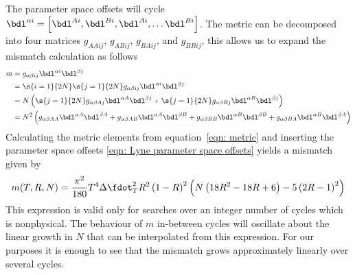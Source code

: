 The parameter
space offsets will cycle $\bdl^{\alpha i} = \left[\bdl^{A i}, \bdl^{B i}, \bdl^{A i}, \dots \bdl^{Bi}\right]$.
The metric can be decomposed into four matrices $g_{AAij}$, $g_{ABij}$, $g_{BAij}$, and $g_{BBij}$, this
allows us to expand the mismatch calculation as follows
\begin{align}
m & = g_{\alpha \beta i j} \bdl^{\alpha i} \bdl^{\beta j} \\
& = \s{i=1}{2N}\s{j=1}{2N} g_{\alpha \beta i j} \bdl^{\alpha i} \bdl^{\beta j} \\
& = N\left(\s{j=1}{2N} g_{\alpha \beta A j} \bdl^{\alpha A} \bdl^{\beta j} + \s{j=1}{2N} g_{\alpha \beta B j} \bdl^{\alpha B} \bdl^{\beta j} \right) \\
& = N^{2}\left(g_{\alpha\beta AA} \bdl^{\alpha A} \bdl^{\beta A} + g_{\alpha \beta AB} \bdl^{\alpha A} \bdl^{\beta B} + g_{\alpha \beta BB} \bdl^{\alpha B} \bdl^{\beta B} + g_{\alpha\beta BA} \bdl^{\alpha B} \bdl^{\beta A}  \right)
\end{align}
Calculating the metric elements from equation~\eqref{eqn: metric} and inserting the parameter space offsets
\eqref{eqn: Lyne parameter space offsets} yields a mismatch given by
\begin{equation}
m(T, R, N) = \frac{\pi^{2}}{180}T^{4}\dST^{2} R^{2}\left(1-R\right)^{2} \left(N \left(18 R^{2} - 18 R + 6\right) - 5 \left(2 R - 1\right)^{2}\right)
\end{equation}
This expression is valid only for searches over an integer number of cycles which is nonphysical.
The behaviour of $m$ in-between cycles will oscillate about the linear growth in $N$ that 
can be interpolated from this expression. For our purposes it is enough to see that the mismatch 
grows approximately linearly over several cycles. 
